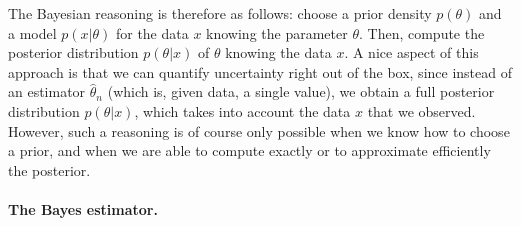 \documentclass[
	fontsize=11pt, %
	twoside=false, %
	numbers=noenddot, %
]{kaobook}
\newcommand{\E}{\mathbb E}
\newcommand{\wh}{\widehat}
\newcommand{\ind}[1]{\mathbf 1_{#1}}
\begin{document}
The Bayesian reasoning is therefore as follows: choose a prior density $p(\theta)$ and a model $p(x | \theta)$ for the data $x$ knowing the parameter $\theta$.
Then, compute%
%
the posterior distribution $p(\theta | x)$ of $\theta$ knowing the data $x$. 
A nice aspect of this approach is that we can quantify uncertainty right out of the box, since instead of an estimator $\wh \theta_n$ (which is, given data, a single value), we obtain a full posterior distribution $p(\theta | x)$, which takes into account the data $x$ that we observed.
However, such a reasoning is of course only possible when we know how to choose a prior, and when we are able to compute exactly or to approximate efficiently the posterior.

\paragraph{The Bayes estimator.} %


\end{document}
